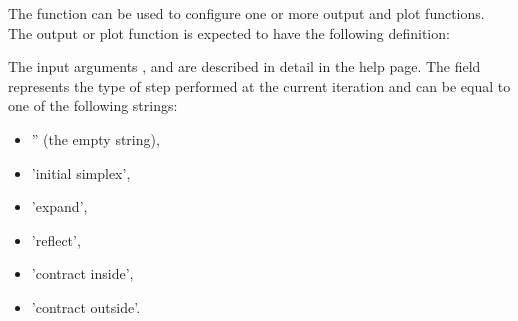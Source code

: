 \begin{Details}

The  function can be used to configure one or more output and
plot functions.
The output or plot function is expected to have the following definition:


The input arguments ,  and  are
described in detail in the  help page. The
 field represents the type of step performed at
the current iteration and can be equal to one of the following strings:
\begin{itemize}

\item '' (the empty string),
\item 'initial simplex',
\item 'expand',
\item 'reflect',
\item 'contract inside',
\item 'contract outside'.

\end{itemize}

\end{Details}
%
